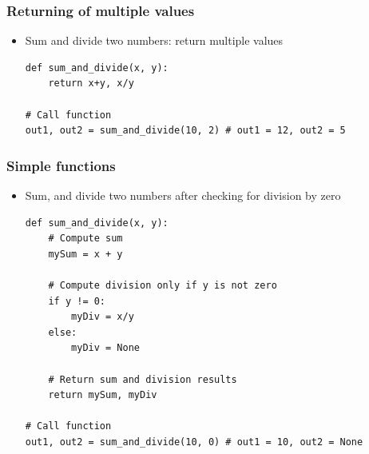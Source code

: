 \documentclass[xcolor=table]{beamer}
\begin{document}
\begin{frame}[fragile]
\frametitle{Returning of multiple values}
\begin{itemize}
    \item<1->Sum and divide two numbers: return multiple values
\begin{lstlisting}[style=python]
def sum_and_divide(x, y):
    return x+y, x/y

# Call function
out1, out2 = sum_and_divide(10, 2) # out1 = 12, out2 = 5
\end{lstlisting}
\end{itemize}
\end{frame}

\begin{frame}[fragile]
\frametitle{Simple functions}

\begin{itemize}[leftmargin=*]
\item<1->Sum, and divide two numbers after checking for division by zero
\begin{lstlisting}[style=python]
def sum_and_divide(x, y):
    # Compute sum
    mySum = x + y
    
    # Compute division only if y is not zero
    if y != 0:
        myDiv = x/y
    else:
        myDiv = None
        
    # Return sum and division results
    return mySum, myDiv

# Call function
out1, out2 = sum_and_divide(10, 0) # out1 = 10, out2 = None
\end{lstlisting}
\end{itemize}

\end{frame}
\end{document}
